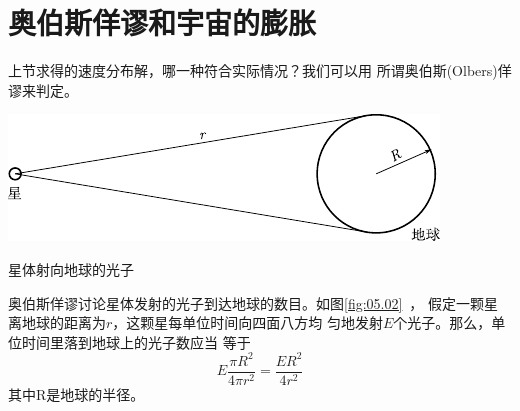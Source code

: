 \section{奥伯斯佯谬和宇宙的膨胀}\label{sec:05.04}

上节求得的速度分布解，哪一种符合实际情况？我们可以用
所谓奥伯斯(Olbers)佯谬来判定。
\begin{figurex}
    \centering
    \includegraphics{figure/fig05.02}
    \caption{星体射向地球的光子}
    \label{fig:05.02}
\end{figurex}

奥伯斯佯谬讨论星体发射的光子到达地球的数目。如图\ref{fig:05.02}~，
假定一颗星离地球的距离为$ r $，这颗星每单位时间向四面八方均
匀地发射$ E $个光子。那么，单位时间里落到地球上的光子数应当
等于
\begin{equation}\label{eqn:05.04.01}
    E \frac { \pi R ^ { 2 } } { 4 \pi r ^ { 2 } } = \frac { E R ^ { 2 } } { 4 r ^ { 2 } }
\end{equation}
其中R是地球的半径。

